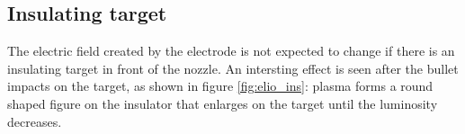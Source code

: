 \subsection{Insulating target}
The electric field created by the electrode is not expected to change if there is an insulating target in front of the nozzle. An intersting effect is seen after the bullet impacts on the target, as shown in figure \ref{fig:elio_ins}: plasma forms a round shaped figure on the insulator that enlarges on the target until the luminosity decreases.

